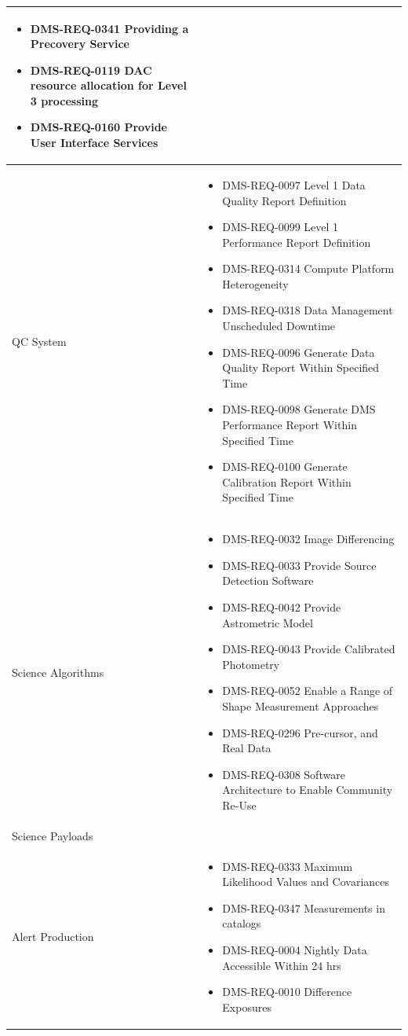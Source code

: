 \documentclass[DM,lsstdraft,toc]{lsstdoc}
\begin{document}
\begin{xtabular}{|p{0.1\textwidth}|p{0.85\textwidth}|}
\begin{itemize}
\item DMS-REQ-0341 Providing a Precovery Service
\item DMS-REQ-0119 DAC resource allocation for Level 3 processing
\item DMS-REQ-0160 Provide User Interface Services \end{itemize} \\ \hline
QC System &
\begin{itemize} \item DMS-REQ-0097 Level 1 Data Quality Report Definition
\item DMS-REQ-0099 Level 1 Performance Report Definition
\item DMS-REQ-0314 Compute Platform Heterogeneity
\item DMS-REQ-0318 Data Management Unscheduled Downtime
\item DMS-REQ-0096 Generate Data Quality Report Within Specified Time
\item DMS-REQ-0098 Generate DMS Performance Report Within Specified Time
\item DMS-REQ-0100 Generate Calibration Report Within Specified Time \end{itemize} \\ \hline
Science Algorithms &
\begin{itemize} \item DMS-REQ-0032 Image Differencing
\item DMS-REQ-0033 Provide Source Detection Software
\item DMS-REQ-0042 Provide Astrometric Model
\item DMS-REQ-0043 Provide Calibrated Photometry
\item DMS-REQ-0052 Enable a Range of Shape Measurement Approaches
\item DMS-REQ-0296 Pre-cursor, and Real Data
\item DMS-REQ-0308 Software Architecture to Enable Community Re-Use \end{itemize} \\ \hline
Science Payloads &
\\ \hline
Alert Production &
\begin{itemize} \item DMS-REQ-0333 Maximum Likelihood Values and Covariances
\item DMS-REQ-0347 Measurements in catalogs
\item DMS-REQ-0004 Nightly Data Accessible Within 24 hrs
\item DMS-REQ-0010 Difference Exposures

\end{itemize}
\end{xtabular}
\end{document}
